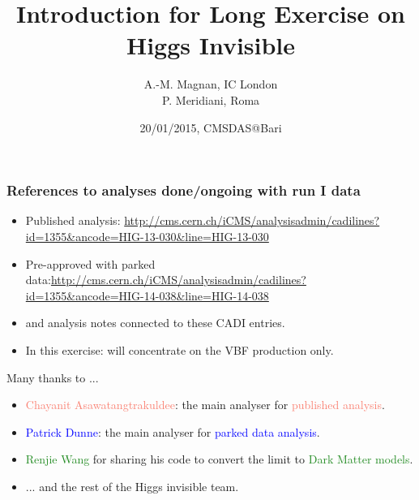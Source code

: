 \documentclass[red,compress,xcolor=table]{beamer}
\title[VBF Higgs invisible] %
{Introduction for Long Exercise on Higgs Invisible}
\subtitle
{} %
\author[A.-M. Magnan] %
{A.-M. Magnan,
IC London \\
P. Meridiani, Roma }
\date[CMSDAS@Bari, 20/01/2015] %
{20/01/2015, CMSDAS@Bari}
\begin{document}
\begin{frame}
  \titlepage
\end{frame}


\begin{frame}
\frametitle{References to analyses done/ongoing with run I data}

\begin{itemize}
\item \scriptsize Published analysis: \url{http://cms.cern.ch/iCMS/analysisadmin/cadilines?id=1355&ancode=HIG-13-030&line=HIG-13-030}
\item \scriptsize Pre-approved with parked data:\url{http://cms.cern.ch/iCMS/analysisadmin/cadilines?id=1355&ancode=HIG-14-038&line=HIG-14-038} 
\item \scriptsize and analysis notes connected to these CADI entries.
\item \scriptsize In this exercise: will concentrate on the VBF production only.
\end{itemize}

\begin{block}{\centering Many thanks to ...}
\begin{itemize}
\item \scriptsize \textcolor{Salmon}{Chayanit Asawatangtrakuldee}: the main analyser for \textcolor{Salmon}{published analysis}.
\item \scriptsize \textcolor{Blue}{Patrick Dunne}: the main analyser for \textcolor{Blue}{parked data analysis}.
\item \scriptsize \textcolor{ForestGreen}{Renjie Wang} for sharing his code to convert the limit to \textcolor{ForestGreen}{Dark Matter models}.
\item \scriptsize ... and the rest of the Higgs invisible team.
\end{itemize}
\end{block}


\end{frame}
\end{document}
